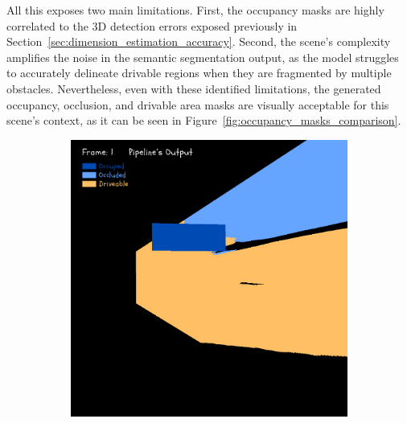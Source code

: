 All this exposes two main limitations. First, the occupancy masks are highly correlated to the 3D detection errors exposed previously in Section~\ref{sec:dimension_estimation_accuracy}. Second, the scene's complexity amplifies the noise in the semantic segmentation output, as the model struggles to accurately delineate drivable regions when they are fragmented by multiple obstacles. Nevertheless, even with these identified limitations, the generated occupancy, occlusion, and drivable area masks are visually acceptable for this scene's context, as it can be seen in Figure~\ref{fig:occupancy_masks_comparison}.

\begin{figure}[htbp]
    \centering
    \begin{subfigure}[b]{0.19\linewidth}
        \centering
        \includegraphics[width=\linewidth]{images/experiments/occ2_masks/dt_occ_mask_colored_1.png}
        \vspace{0.5em} %

\end{subfigure}
\end{figure}
